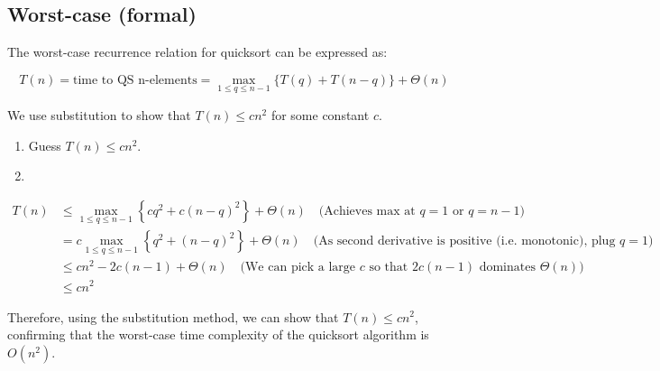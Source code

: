 \subsection{Worst-case (formal)}
    \begin{derivation}
        The worst-case recurrence relation for quicksort can be expressed as:

        \[
        T(n) = \text{time to QS n-elements} = \max_{1 \leq q \leq n-1} \{ T(q) + T(n-q) \} + \Theta(n)
        \]

        \begin{center}
        \end{center}

        \noindent We use substitution to show that \( T(n) \leq cn^2 \) for some constant \( c \).
        \begin{enumerate}
            \item Guess \( T(n) \leq cn^2 \).
            \item 
        \end{enumerate}
        \begin{align*}
            T(n) &\leq \max_{1 \leq q \leq n-1} \left\{ cq^2 + c(n-q)^2 \right\} + \Theta(n) \quad \text{(Achieves max at } q = 1 \text{ or } q = n-1 \text{)} \\
                 &= c \max_{1 \leq q \leq n-1} \left\{ q^2 + (n-q)^2 \right\} + \Theta(n) \quad \text{(As second derivative is positive (i.e. monotonic), plug } q = 1 \text{)} \\
                 &\leq cn^2 - 2c(n-1) + \Theta(n) \quad \text{(We can pick a large } c \text{ so that } 2c(n-1) \text{ dominates } \Theta(n)) \\
                 &\leq cn^2
        \end{align*}

        \noindent Therefore, using the substitution method, we can show that \( T(n) \leq cn^2 \), confirming that the worst-case time complexity of the quicksort algorithm is \( O(n^2) \).
    \end{derivation}

